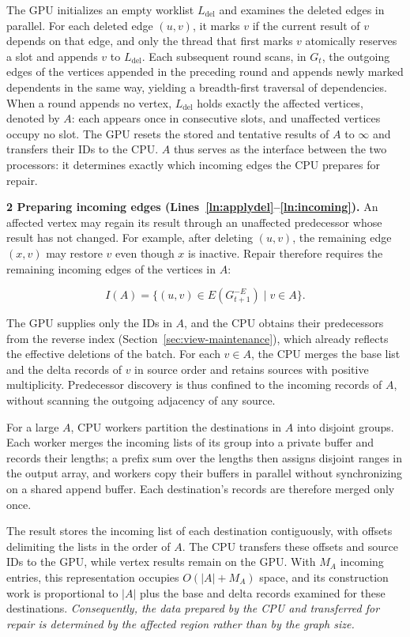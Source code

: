The GPU initializes an empty worklist $L_{\mathrm{del}}$ and examines the deleted edges in parallel. For each deleted edge $(u,v)$, it marks $v$ if the current result of $v$ depends on that edge, and only the thread that first marks $v$ atomically reserves a slot and appends $v$ to $L_{\mathrm{del}}$. Each subsequent round scans, in $G_t$, the outgoing edges of the vertices appended in the preceding round and appends newly marked dependents in the same way, yielding a breadth-first traversal of dependencies. When a round appends no vertex, $L_{\mathrm{del}}$ holds exactly the affected vertices, denoted by $A$: each appears once in consecutive slots, and unaffected vertices occupy no slot. The GPU resets the stored and tentative results of $A$ to $\infty$ and transfers their IDs to the CPU. $A$ thus serves as the interface between the two processors: it determines exactly which incoming edges the CPU prepares for repair.

\textbf{2 Preparing incoming edges (Lines~\ref{ln:applydel}--\ref{ln:incoming}).} An affected vertex may regain its result through an unaffected predecessor whose result has not changed. For example, after deleting $(u,v)$, the remaining edge $(x,v)$ may restore $v$ even though $x$ is inactive. Repair therefore requires the remaining incoming edges of the vertices in $A$:

\begin{equation}
I(A)=\{(u,v)\in E(G_{t+1}^{-E})\mid v\in A\}.
\end{equation}

The GPU supplies only the IDs in $A$, and the CPU obtains their predecessors from the reverse index (Section~\ref{sec:view-maintenance}), which already reflects the effective deletions of the batch. For each $v\in A$, the CPU merges the base list and the delta records of $v$ in source order and retains sources with positive multiplicity. Predecessor discovery is thus confined to the incoming records of $A$, without scanning the outgoing adjacency of any source.

For a large $A$, CPU workers partition the destinations in $A$ into disjoint groups. Each worker merges the incoming lists of its group into a private buffer and records their lengths; a prefix sum over the lengths then assigns disjoint ranges in the output array, and workers copy their buffers in parallel without synchronizing on a shared append buffer. Each destination's records are therefore merged only once.

The result stores the incoming list of each destination contiguously, with offsets delimiting the lists in the order of $A$. The CPU transfers these offsets and source IDs to the GPU, while vertex results remain on the GPU. With $M_A$ incoming entries, this representation occupies $O(|A|+M_A)$ space, and its construction work is proportional to $|A|$ plus the base and delta records examined for these destinations. \textit{Consequently, the data prepared by the CPU and transferred for repair is determined by the affected region rather than by the graph size.}

